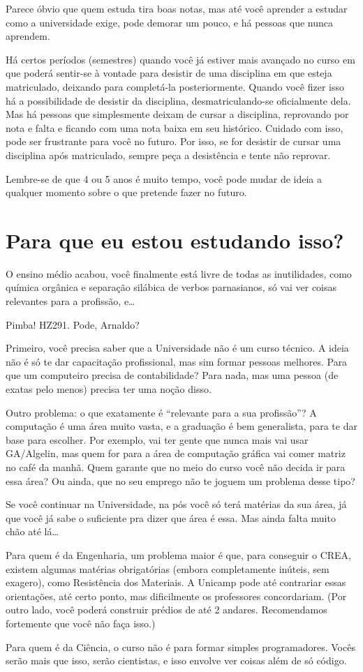 Parece óbvio que quem estuda tira boas notas, mas até você aprender a estudar como
a universidade exige, pode demorar um pouco, e há pessoas que nunca aprendem.

Há certos períodos (semestres) quando você já estiver mais avançado no curso em
que poderá sentir-se à vontade para desistir de uma disciplina em que esteja
matriculado, deixando para completá-la posteriormente. Quando você fizer isso há
a possibilidade de desistir da disciplina, desmatriculando-se oficialmente dela.
Mas há pessoas que simplesmente deixam de cursar a disciplina, reprovando por
nota e falta e ficando com uma nota baixa em seu histórico. Cuidado com isso,
pode ser frustrante para você no futuro. Por isso, se for desistir de cursar uma
disciplina após matriculado, sempre peça a desistência e tente não reprovar.

Lembre-se de que 4 ou 5 anos é muito tempo, você pode mudar de ideia a qualquer
momento sobre o que pretende fazer no futuro.

\section{Para que eu estou estudando isso?}

O ensino médio acabou, você finalmente está livre de todas as inutilidades, como
química orgânica e separação silábica de verbos parnasianos, só vai ver coisas
relevantes para a profissão, e{\dots}

Pimba! HZ291. Pode, Arnaldo?

Primeiro, você precisa saber que a Universidade não é um curso técnico. A ideia
não é só te dar capacitação profissional, mas sim formar pessoas melhores. Para
que um computeiro precisa de contabilidade? Para nada, mas uma pessoa (de exatas
pelo menos) precisa ter uma noção disso.

Outro problema: o que exatamente é ``relevante para a sua profissão''?
A computação é uma área muito vasta, e a graduação
é bem generalista, para te dar base para escolher. Por exemplo,
vai ter gente que nunca mais vai usar GA/Algelin, mas quem for para a área de
computação gráfica vai comer matriz no café da manhã. Quem garante que no meio
do curso você não decida ir para essa área? Ou ainda, que no seu emprego não te
joguem um problema desse tipo?

Se você continuar na Universidade, na pós você só terá matérias da sua área, já
que você já sabe o suficiente pra dizer que área é essa. Mas ainda falta muito
chão até lá{\dots}

Para quem é da Engenharia, um problema maior é que, para conseguir o CREA,
existem algumas matérias obrigatórias (embora completamente inúteis, sem
exagero), como Resistência dos Materiais. A Unicamp pode até contrariar essas orientações, até
certo ponto, mas dificilmente os professores concordariam. (Por outro lado,
você poderá construir prédios de até 2 andares. Recomendamos fortemente que você
não faça isso.)

Para quem é da Ciência, o curso não é para formar simples programadores. Vocês serão
mais que isso, serão cientistas, e isso envolve ver coisas além de só código.